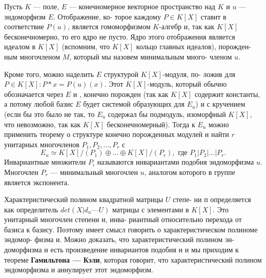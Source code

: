 \documentclass{../template/mai_book}
\begin{document}
\begin{mynotice}
Пусть $K$ — поле, $E$ — конечномерное векторное\linebreak
пространство над $K$ и $u$ — эндоморфизм $E$. Отображение, ко­-\linebreak
торое каждому $P \in K[X]$ ставит в соответствие $P(u)$, является\linebreak
гомоморфизмом $K$-алгебр и, так как $K[X]$ бесконечномерно, то\linebreak
его ядро не пусто. Ядро этого отображения является идеалом в\linebreak
$K[X]$ (вспомним, что $K[X]$ кольцо главных идеалов), порожден­-\linebreak
ным многочленом $M$, который мы назовем минимальным много­-\linebreak
членом $u$.

Кроме того, можно наделить $E$ структурой $K[X]$-модуля, по­-\linebreak
ложив для $P \in K[X]: P*x = P(u)(x)$. Этот $K[X]$-модуль, который\linebreak
обычно обозначается через $E$ и , конечно порожден (так как $K[X]$\linebreak
содержит константы, а потому любой базис $E$ будет системой\linebreak
образующих для $E_u$) и с кручением (если бы это было не так, то\linebreak
$E_u$ содержал бы подмодуль, изоморфный $K[X]$, что невозможно,\linebreak
так как $K[X]$ бесконечномерный). Тогда к $E_u$ можно применить\linebreak
теорему о структуре конечно порожденных модулей и найти $r$\linebreak
унитарных многочленов $P_1,P_2,...,P_r$ с
$$E_u \simeq K[X]/(P_1) \oplus...\oplus K[X]/(P_r), \text{ где } P_1 | P_2 | ... | P_r.$$
\newpage
\noindent Инвариантные множители $P_i$ называются инвариантами подо­бия\linebreak
 эндоморфизма $u$. Многочлен $P_r$ --- минимальный многочлен\linebreak
$u$, аналогом которого в группе является экспонента.

Характеристический полином квадратной матрицы $U$ степе­-\linebreak
ни п определяется как определитель $det(X|d_n — U)$ матрицы с\linebreak
элементами в $K[X]$. Это унитарный многочлен степени и, инва­-\linebreak
риантный относительно перехода от базиса к базису. Поэтому\linebreak
имеет смысл говорить о характеристическом полиноме эндомор­-\linebreak
физма и. Можно доказать, что характеристический полином эн­-\linebreak
доморфизма и есть произведение инвариантов подобия и и мы\linebreak
приходим к теореме \textbf{Гамильтона — Кэли}, которая говорит,\linebreak
что характеристический полином эндоморфизма и аннулирует\linebreak
этот эндоморфизм.


\end{mynotice}
\end{document}
